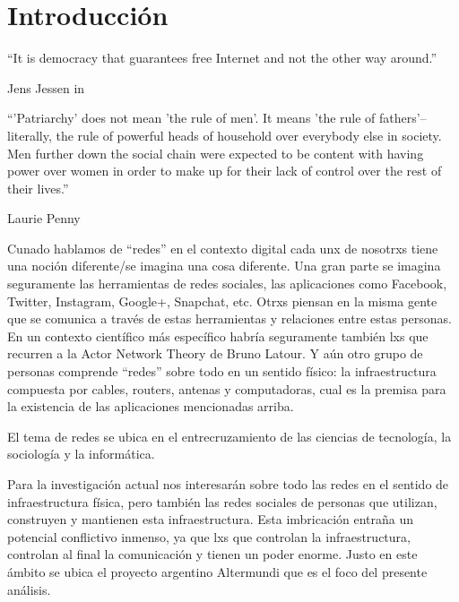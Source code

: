 \section{Introducción}

\epigraph{``It is democracy that guarantees free Internet and not the other way around.''}{Jens Jessen in~\autocite{Rieder2012}}
\epigraph{``'Patriarchy' does not mean 'the rule of men'. It means 'the rule of fathers'--literally, the rule of powerful heads of household over everybody else in society. Men further down the social chain were expected to be content with having power over women in order to make up for their lack of control over the rest of their lives.''}{Laurie Penny~\autocite[69]{Penny2014}}


Cunado hablamos de ``redes'' en el contexto digital cada unx de nosotrxs tiene una noción diferente/se imagina una cosa diferente.
Una gran parte se imagina seguramente las herramientas de redes sociales, las aplicaciones como Facebook, Twitter, Instagram, Google+, Snapchat, etc.
Otrxs piensan en la misma gente que se comunica a través de estas herramientas y relaciones entre estas personas.
En un contexto científico más específico habría seguramente también lxs que recurren a la Actor Network Theory de Bruno Latour.
Y aún otro grupo de personas comprende ``redes'' sobre todo en un sentido físico: la infraestructura compuesta por cables, routers, antenas y computadoras, cual es la premisa para la existencia de las aplicaciones mencionadas arriba.


El tema de redes se ubica en el entrecruzamiento de las ciencias de tecnología, la sociología y la informática.

\begin{comment}
por qué es importante/interesante?
	\item Erläutern Sie kurz, in welchem Themenbereich Ihre Arbeit angesiedelt ist. Wo werden Sie einen Beitrag leisten?
	\item Das Ziel sollte es sein, den groben Kontext Ihrer Arbeit darzustellen.

Política digital <-- Gabriella Coleman heranziehen
\end{comment}



Para la investigación actual nos interesarán sobre todo las redes en el sentido de infraestructura física, pero también las redes sociales de personas que utilizan, construyen y mantienen esta infraestructura.
Esta imbricación entraña un potencial conflictivo inmenso, ya que lxs que controlan la infraestructura, controlan al final la comunicación y tienen un poder enorme.
Justo en este ámbito se ubica el proyecto argentino Altermundi que es el foco del presente análisis.


